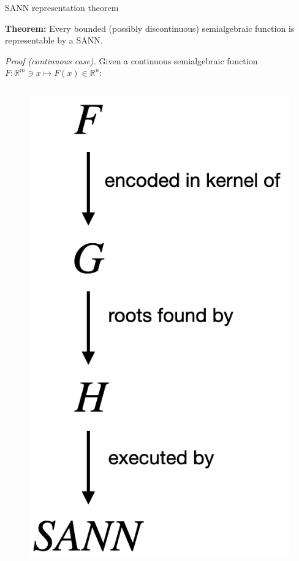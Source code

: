 \documentclass[final]{beamer}
\newlength{\lrcolwidth}
\begin{document}
\begin{frame}[t]
\begin{columns}[t]
\begin{column}{\lrcolwidth}
  \begin{block}{SANN representation theorem}

      \textbf{Theorem:} Every bounded (possibly discontinuous) semialgebraic function is representable by a SANN.

    \emph{Proof (continuous case).} Given a continuous semialgebraic function $F: \mathbb{R}^{m} \ni x \mapsto F(x) \in \mathbb{R}^n$:

    \begin{columns}[t]
      \begin{column}{0.19\textwidth}
        \vspace{2cm}
        \begin{figure}[t]
          \centering
          \includegraphics[width=\textwidth]{images/overview.png}       

\end{figure}
\end{column}
\end{columns}
\end{block}
\end{column}
\end{columns}
\end{frame}
\end{document}
